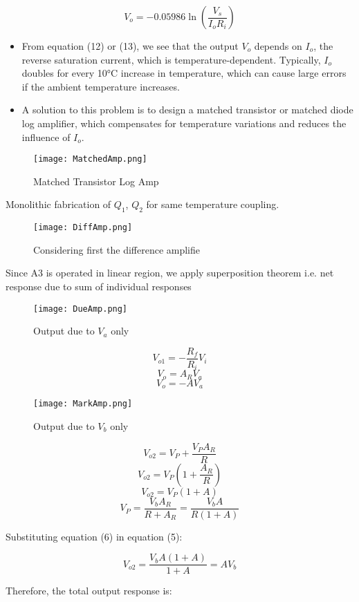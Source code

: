 \documentclass[a4paper,9pt,twoside,openany,twocolumn]{memoir}
\begin{document}
\[
V_o = -0.05986 \ln \left( \frac{V_s}{I_o R_i} \right) \tag{13}
\]


\begin{itemize}
    \item From equation (12) or (13), we see that the output \( V_o \) depends on \( I_o \), the reverse saturation current, which is temperature-dependent. Typically, \( I_o \) doubles for every 10°C increase in temperature, which can cause large errors if the ambient temperature increases.
    \item A solution to this problem is to design a matched transistor or matched diode log amplifier, which compensates for temperature variations and reduces the influence of \( I_o \).
\end{itemize}
\begin{figure}[H]
    \centering
    \texttt{[image: MatchedAmp.png]}
    \caption{Matched Transistor Log Amp}
    \label{fig:question_image}
\end{figure}
Monolithic fabrication of $Q_1$, $Q_2$ for same temperature coupling.
\begin{figure}[H]
    \centering
    \texttt{[image: DiffAmp.png]}
    \caption{Considering first the difference amplifie}
    \label{fig:question_image}
\end{figure}
Since A3 is operated in linear region, we apply superposition theorem i.e. net response due to sum of individual responses
\begin{figure}[H]
    \centering
    \texttt{[image: DueAmp.png]}
    \caption{Output due to $V_a$ only}
    \label{fig:question_image}
\end{figure}


\[
V_{o1} = -\frac{R_f}{R_i} V_i \tag{1}
\]
\[
V_o = A_R V_a \tag{2}
\]
\[
V_o = - A V_a \tag{3}
\]
\begin{figure}[H]
    \centering
    \texttt{[image: MarkAmp.png]}
    \caption{Output due to $V_b$ only}
    \label{fig:question_image}
\end{figure}
\[
V_{o2} = V_P + \frac{V_P A_R}{R} \tag{4}
\]
\[
V_{o2} = V_P \left( 1 + \frac{A_R}{R} \right) \tag{4a}
\]
\[
V_{o2} = V_P \left( 1 + A \right) \tag{5}
\]
\[
V_P = \frac{V_b A_R}{R + A_R} = \frac{V_b A}{R(1 + A)} \tag{6}
\]

Substituting equation (6) in equation (5):

\[
V_{o2} = \frac{V_b A (1 + A)}{1 + A} = A V_b \tag{7}
\]

Therefore, the total output response is:
\end{document}
